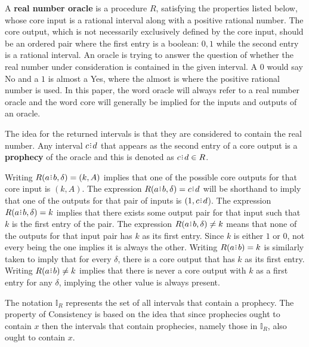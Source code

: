 \documentclass[12pt]{article}
\begin{document}
A \textbf{real number oracle} is a procedure $R$, satisfying the properties listed below, whose core input is a rational interval along with a positive rational number. The core output, which is not necessarily exclusively defined by the core input, should be an ordered pair where the first entry is a boolean:  $0, 1$ while the second entry is a rational interval. An oracle is trying to answer the question of whether the real number under consideration is contained in the given interval. A $0$ would say No and a $1$ is almost a Yes, where the almost is where the positive rational number is used.  In this paper, the word oracle will always refer to a real number oracle and the word core will generally be implied for the inputs and outputs of an oracle.


The idea for the returned intervals is that they are considered to contain the real number. Any interval $c\rint d$ that appears as the second entry of a core output is a \textbf{prophecy} of the oracle and this is denoted as $c\rint d \in R$. 

Writing $R(a\rint b, \delta)=(k ,A)$ implies that one of the possible core outputs for that core input is $(k, A)$. The expression $R(a\rint b, \delta) = c\rint d$ will be shorthand to imply that one of the outputs for that pair of inputs is $(1, c\rint d$).  The expression $R(a \rint b, \delta) = k$ implies that there exists some output pair for that input such that $k$ is the first entry of the pair. The expression $R(a\rint b, \delta) \neq k$ means that none of the outputs for that input pair has $k$ as its first entry. Since $k$ is either $1$ or $0$, not every being the one implies it is always the other. Writing $R(a \rint b) = k$ is similarly taken to imply that for every $\delta$, there is a core output that has $k$ as its first entry. Writing $R(a \rint b) \neq k$ implies that there is never a core output with $k$ as a first entry for any $\delta$, implying the other value is always present. 

The notation $\mathbb{I}_R$ represents the set of all intervals that contain a prophecy. The property of Consistency is based on the idea that since prophecies ought to contain $x$ then the intervals that contain prophecies, namely those in $\mathbb{I}_R$,  also ought to contain $x$. 
\end{document}
